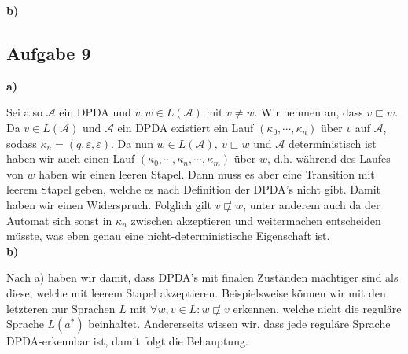 \documentclass[a4paper,graphics,11pt]{article}
\newcommand{\aufgabe}[1]{\subsection*{Aufgabe #1}}
\begin{document}
\textbf{b)}
\begin{center}
\end{center}

\newpage

\aufgabe{9}
\textbf{a)}

Sei also $\mathcal{A}$ ein DPDA und $v,w \in L(\mathcal{A})$ mit $v\neq w$. Wir nehmen an, dass $v \sqsubset w$.
Da $v \in L(\mathcal{A})$ und $\mathcal{A}$ ein DPDA existiert ein Lauf $(\kappa_0, \cdots, \kappa_n)$ über
$v$ auf $\mathcal{A}$, sodass $\kappa_n = (q, \varepsilon, \varepsilon)$. Da nun $w \in L(\mathcal{A}),\ v \sqsubset w$
und $\mathcal{A}$ deterministisch ist haben wir auch einen Lauf $(\kappa_0, \cdots, \kappa_n, \cdots, \kappa_m)$
über $w$, d.h. während des Laufes von $w$ haben wir einen leeren Stapel. Dann muss es aber eine
Transition mit leerem Stapel geben, welche es nach Definition der DPDA's nicht gibt. Damit haben wir einen Widerspruch.
Folglich gilt $v \not\sqsubset w$, unter anderem auch da der Automat sich sonst in $\kappa_n$ zwischen akzeptieren
und weitermachen entscheiden müsste, was eben genau eine nicht-deterministische Eigenschaft ist.\\


\textbf{b)}

Nach a) haben wir damit, dass DPDA's mit finalen Zuständen mächtiger sind als diese, welche mit
leerem Stapel akzeptieren. Beispielsweise können wir mit den letzteren nur Sprachen $L$ mit
$\forall w,v \in L: w \not\sqsubset v$ erkennen, welche nicht die reguläre Sprache $L(a^*)$
beinhaltet. Andererseits wissen wir, dass jede reguläre Sprache DPDA-erkennbar ist, damit folgt die Behauptung.
\end{document}
